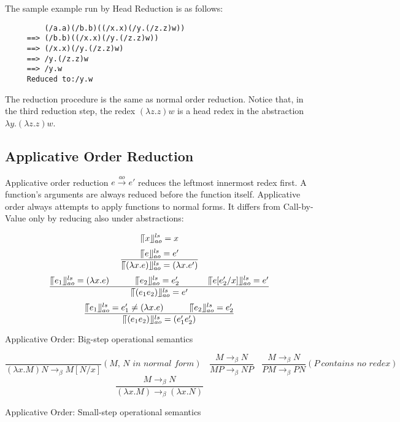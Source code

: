 The sample example run by Head Reduction is as follows:

\begin{verbatim}
         (/a.a)(/b.b)((/x.x)(/y.(/z.z)w))
     ==> (/b.b)((/x.x)(/y.(/z.z)w))
     ==> (/x.x)(/y.(/z.z)w)
     ==> /y.(/z.z)w
     ==> /y.w
     Reduced to:/y.w
\end{verbatim}

The reduction procedure is the same as normal order reduction. Notice that, in the third reduction step, the redex $(\lambda z.z)w$ is a head redex in the abstraction $\lambda y.(\lambda z.z)w$. 

\subsection{Applicative Order Reduction}

Applicative order reduction $e\xrightarrow{ao} e'$ reduces the leftmost innermost redex first. A function's arguments are always reduced before the function itself. Applicative order always attempts to apply functions to normal forms. It differs from Call-by-Value only by reducing also under abstractions:


\begin{equation*}
\llceil x \rrfloor ^{ls} _{ao} = x
\end{equation*}
\begin{equation*}
\frac{\llceil e \rrfloor ^{ls} _{ao} = e'}{\llceil (\lambda x.e) \rrfloor ^{ls} _{ao} = (\lambda x.e')}
\end{equation*}
\begin{equation*}
\frac{\llceil e_1 \rrfloor ^{ls} _{ao} = (\lambda x.e)\ \ \ \ \ \ \ \ \ \llceil e_2 \rrfloor ^{ls} _{ao} = e'_2\ \ \ \ \ \ \ \ \ \ \llceil e[e'_2/x] \rrfloor ^{ls} _{ao} = e'}{\llceil (e_1e_2) \rrfloor ^{ls} _{ao} = e'}
\end{equation*}
\begin{equation*}
\frac{\llceil e_1 \rrfloor ^{ls} _{ao} = e'_1\neq (\lambda x.e)\ \ \ \ \ \ \ \ \ \llceil e_2 \rrfloor ^{ls} _{ao} = e'_2}{\llceil (e_1e_2) \rrfloor ^{ls} _{ao} = (e'_1e'_2)}
\end{equation*}
\begin{center}
Applicative Order: Big-step operational semantics
\end{center}

\begin{equation*}
\frac{}{(\lambda x.M)N \rightarrow _\beta M[N/x]}(\textit{M, N in normal form})\ \ \ \ 
\frac{M \rightarrow _\beta N}{MP \rightarrow _\beta NP}\ \ \ \ 
\frac{M \rightarrow _\beta N}{PM \rightarrow _\beta PN}(P\ \textit{contains no redex})\ \ \ \ 
\end{equation*}
\begin{equation*}
\frac{M \rightarrow _\beta N}{(\lambda x.M) \rightarrow _\beta (\lambda x.N)}
\end{equation*}
\begin{center}
Applicative Order: Small-step operational semantics
\end{center}

